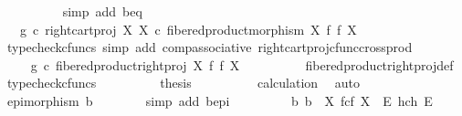 \begin{isabellebody}
\ \ \ \ \ \ \ \ \isamarkupfalse%
\ {\isacharparenleft}{\kern0pt}simp\ add{\isacharcolon}{\kern0pt}\ b{\isacharunderscore}{\kern0pt}eq{\isacharparenright}{\kern0pt}\isanewline
\ \ \ \ \ \ \isamarkupfalse%
\ \isamarkupfalse%
\ {\isachardoublequoteopen}{\isachardot}{\kern0pt}{\isachardot}{\kern0pt}{\isachardot}{\kern0pt}\ {\isacharequal}{\kern0pt}\ g\ {\isasymcirc}\isactrlsub c\ right{\isacharunderscore}{\kern0pt}cart{\isacharunderscore}{\kern0pt}proj\ X\ X\ {\isasymcirc}\isactrlsub c\ fibered{\isacharunderscore}{\kern0pt}product{\isacharunderscore}{\kern0pt}morphism\ X\ f\ f\ X{\isachardoublequoteclose}\isanewline
\ \ \ \ \ \ \ \ \isamarkupfalse%
\ {\isacharparenleft}{\kern0pt}typecheck{\isacharunderscore}{\kern0pt}cfuncs{\isacharcomma}{\kern0pt}\ simp\ add{\isacharcolon}{\kern0pt}\ comp{\isacharunderscore}{\kern0pt}associative{}\ right{\isacharunderscore}{\kern0pt}cart{\isacharunderscore}{\kern0pt}proj{\isacharunderscore}{\kern0pt}cfunc{\isacharunderscore}{\kern0pt}cross{\isacharunderscore}{\kern0pt}prod{\isacharparenright}{\kern0pt}\isanewline
\ \ \ \ \ \ \isamarkupfalse%
\ \isamarkupfalse%
\ {\isachardoublequoteopen}{\isachardot}{\kern0pt}{\isachardot}{\kern0pt}{\isachardot}{\kern0pt}\ {\isacharequal}{\kern0pt}\ g\ {\isasymcirc}\isactrlsub c\ fibered{\isacharunderscore}{\kern0pt}product{\isacharunderscore}{\kern0pt}right{\isacharunderscore}{\kern0pt}proj\ X\ f\ f\ X{\isachardoublequoteclose}\isanewline
\ \ \ \ \ \ \ \ \isamarkupfalse%
\ fibered{\isacharunderscore}{\kern0pt}product{\isacharunderscore}{\kern0pt}right{\isacharunderscore}{\kern0pt}proj{\isacharunderscore}{\kern0pt}def\ \isamarkupfalse%
\ {\isacharparenleft}{\kern0pt}typecheck{\isacharunderscore}{\kern0pt}cfuncs{\isacharparenright}{\kern0pt}\isanewline
\ \ \ \ \ \ \isamarkupfalse%
\ \isamarkupfalse%
\ {\isacharquery}{\kern0pt}thesis\isanewline
\ \ \ \ \ \ \ \ \isamarkupfalse%
\ calculation\ \isamarkupfalse%
\ auto\isanewline
\ \ \ \ \isamarkupfalse%
\isanewline
\ \ \ \ \isamarkupfalse%
\ {\isachardoublequoteopen}epimorphism\ b{\isachardoublequoteclose}\isanewline
\ \ \ \ \ \ \isamarkupfalse%
\ {\isacharparenleft}{\kern0pt}simp\ add{\isacharcolon}{\kern0pt}\ b{\isacharunderscore}{\kern0pt}epi{\isacharparenright}{\kern0pt}\isanewline
\ \ \isamarkupfalse%
\ \ \isanewline
\ \ \isamarkupfalse%
\ {\isachardoublequoteopen}{\isasymexists}{\isacharbang}{\kern0pt}b{\isachardot}{\kern0pt}\ b\ {\isacharcolon}{\kern0pt}\ X\ \isactrlbsub f\isactrlesub {\isasymtimes}\isactrlsub c\isactrlbsub f\isactrlesub \ X\ {\isasymrightarrow}\ E\ \isactrlbsub h\isactrlesub {\isasymtimes}\isactrlsub c\isactrlbsub h\isactrlesub \ E\ {\isasymand}\isanewline

\end{isabellebody}
